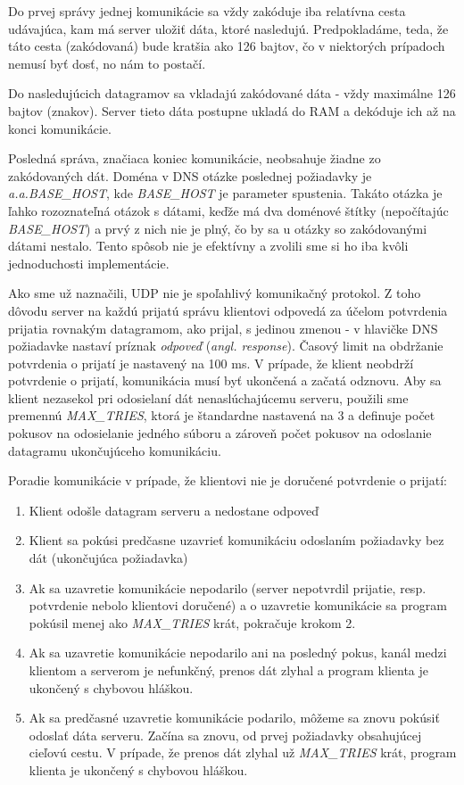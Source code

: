 \documentclass[a4paper]{article}
\begin{document}
  Do prvej správy jednej komunikácie sa vždy zakóduje iba relatívna cesta
  udávajúca, kam má server uložiť dáta, ktoré nasledujú. Predpokladáme, teda,
  že táto cesta (zakódovaná) bude kratšia ako 126 bajtov, čo v niektorých
  prípadoch nemusí byť dosť, no nám to postačí.

  Do nasledujúcich datagramov sa vkladajú zakódované dáta - vždy maximálne 126
  bajtov (znakov). Server tieto dáta postupne ukladá do RAM a dekóduje ich až
  na konci komunikácie.

  Posledná správa, značiaca koniec komunikácie, neobsahuje žiadne zo
  zakódovaných dát. Doména v DNS otázke poslednej požiadavky je
  \textit{a.a.BASE\_HOST}, kde \textit{BASE\_HOST} je parameter spustenia.
  Takáto otázka je ľahko rozoznateľná otázok s dátami, keďže má dva doménové
  štítky (nepočítajúc \textit{BASE\_HOST}) a prvý z nich nie je plný, čo by sa
  u otázky so zakódovanými dátami nestalo.  Tento spôsob nie je efektívny a
  zvolili sme si ho iba kvôli jednoduchosti implementácie.

  Ako sme už naznačili, UDP nie je spoľahlivý komunikačný protokol. Z toho
  dôvodu server na každú prijatú správu klientovi odpovedá za účelom potvrdenia
  prijatia rovnakým datagramom, ako prijal, s jedinou zmenou - v hlavičke DNS
  požiadavke nastaví príznak \textit{odpoveď} (\textit{angl. response}). Časový
  limit na obdržanie potvrdenia o prijatí je nastavený na 100 ms. V prípade, že
  klient neobdrží potvrdenie o prijatí, komunikácia musí byť ukončená a začatá
  odznovu. Aby sa klient nezasekol pri odosielaní dát nenaslúchajúcemu serveru,
  použili sme premennú \textit{MAX\_TRIES}, ktorá je štandardne nastavená na 3
  a definuje počet pokusov na odosielanie jedného súboru a zároveň počet
  pokusov na odoslanie datagramu ukončujúceho komunikáciu.

  \begin{samepage}
    Poradie komunikácie v prípade, že klientovi nie je doručené potvrdenie o prijatí:
  \begin{enumerate}
    \item Klient odošle datagram serveru a nedostane odpoveď
    \item Klient sa pokúsi predčasne uzavrieť komunikáciu odoslaním požiadavky
      bez dát (ukončujúca požiadavka)
    \item Ak sa uzavretie komunikácie nepodarilo (server nepotvrdil prijatie,
      resp. potvrdenie nebolo klientovi doručené) a o uzavretie komunikácie sa
      program pokúsil menej ako \textit{MAX\_TRIES} krát, pokračuje krokom 2.
    \item Ak sa uzavretie komunikácie nepodarilo ani na posledný pokus, kanál
      medzi klientom a serverom je nefunkčný, prenos dát zlyhal a program
      klienta je ukončený s chybovou hláškou.
    \item Ak sa predčasné uzavretie komunikácie podarilo, môžeme sa znovu
      pokúsiť odoslať dáta serveru. Začína sa znovu, od prvej požiadavky
      obsahujúcej cieľovú cestu. V prípade, že prenos dát zlyhal už
      \textit{MAX\_TRIES} krát, program klienta je ukončený s chybovou hláškou.
  \end{enumerate}
  \end{samepage}
      
\end{document}
